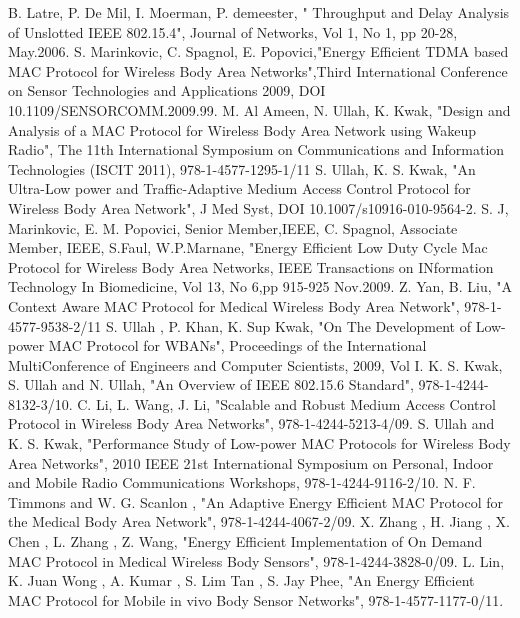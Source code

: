 \documentclass[10pt, conference, compsocconf]{IEEEtran}
\begin{document}
\begin{thebibliography}{1}
B. Latre, P. De Mil, I. Moerman, P. demeester, " Throughput and Delay Analysis of Unslotted IEEE 802.15.4", Journal of Networks, Vol 1, No 1, pp 20-28, May.2006.
S. Marinkovic, C. Spagnol, E. Popovici,"Energy Efficient TDMA based MAC Protocol for Wireless Body Area Networks",Third International Conference on Sensor Technologies and Applications 2009, DOI 10.1109/SENSORCOMM.2009.99.
M. Al Ameen, N. Ullah, K. Kwak, "Design and Analysis of a MAC Protocol for Wireless Body Area Network using Wakeup Radio", The 11th International Symposium on Communications and Information Technologies (ISCIT 2011), 978-1-4577-1295-1/11
S. Ullah, K. S. Kwak, "An Ultra-Low power and Traffic-Adaptive Medium Access Control Protocol for Wireless Body Area Network", J Med Syst, DOI 10.1007/s10916-010-9564-2.
S. J, Marinkovic, E. M. Popovici, Senior Member,IEEE, C. Spagnol, Associate Member, IEEE, S.Faul, W.P.Marnane, "Energy Efficient Low Duty Cycle Mac Protocol for Wireless Body Area Networks, IEEE Transactions on INformation Technology In Biomedicine, Vol 13, No 6,pp 915-925 Nov.2009.
Z. Yan, B. Liu, "A Context Aware MAC Protocol for Medical Wireless Body Area Network", 978-1-4577-9538-2/11
S. Ullah , P. Khan, K. Sup Kwak, "On The Development of Low-power MAC Protocol for WBANs", Proceedings of the International MultiConference of Engineers and Computer Scientists, 2009, Vol I.
K. S. Kwak, S. Ullah and N. Ullah, "An Overview of IEEE 802.15.6 Standard", 978-1-4244-8132-3/10.
C. Li, L. Wang, J. Li, "Scalable and Robust Medium Access Control Protocol in Wireless Body Area Networks", 978-1-4244-5213-4/09.
S. Ullah and K. S. Kwak, "Performance Study of Low-power MAC Protocols for Wireless Body Area Networks",  2010 IEEE 21st International Symposium on Personal, Indoor and Mobile Radio Communications Workshops, 978-1-4244-9116-2/10.
N. F. Timmons and W. G. Scanlon , "An Adaptive Energy Efficient MAC Protocol for the Medical Body Area Network", 978-1-4244-4067-2/09.
X. Zhang , H. Jiang , X. Chen , L. Zhang , Z. Wang, "Energy Efficient Implementation of On Demand MAC Protocol in Medical Wireless Body Sensors", 978-1-4244-3828-0/09.
L. Lin, K. Juan Wong , A. Kumar , S. Lim Tan , S. Jay Phee, "An Energy Efficient MAC Protocol for Mobile in vivo Body Sensor Networks", 978-1-4577-1177-0/11.
\end{thebibliography}
\end{document}
